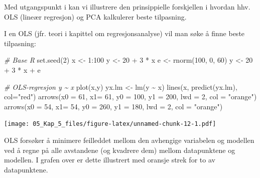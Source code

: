 \documentclass[
]{article}
\newenvironment{Shaded}{\begin{snugshade}}{\end{snugshade}}
\newcommand{\AttributeTok}[1]{\textcolor[rgb]{0.77,0.63,0.00}{#1}}
\newcommand{\CommentTok}[1]{\textcolor[rgb]{0.56,0.35,0.01}{\textit{#1}}}
\newcommand{\DecValTok}[1]{\textcolor[rgb]{0.00,0.00,0.81}{#1}}
\newcommand{\FunctionTok}[1]{\textcolor[rgb]{0.00,0.00,0.00}{#1}}
\newcommand{\NormalTok}[1]{#1}
\newcommand{\OtherTok}[1]{\textcolor[rgb]{0.56,0.35,0.01}{#1}}
\newcommand{\SpecialCharTok}[1]{\textcolor[rgb]{0.00,0.00,0.00}{#1}}
\newcommand{\StringTok}[1]{\textcolor[rgb]{0.31,0.60,0.02}{#1}}
\begin{document}
Med utgangspunkt i \citet{longPrincipalComponentAnalysis2010} kan vi illustrere den prinsippielle forskjellen i hvordan hhv. OLS (lineær regresjon) og PCA kalkulerer beste tilpasning.

I en OLS (jfr. teori i kapittel om regresjonsanalyse) vil man søke å finne beste tilpasning:

\begin{Shaded}
\begin{Highlighting}[]
\CommentTok{\# Base R}
\FunctionTok{set.seed}\NormalTok{(}\DecValTok{2}\NormalTok{)}
\NormalTok{x }\OtherTok{\textless{}{-}} \DecValTok{1}\SpecialCharTok{:}\DecValTok{100}
\NormalTok{y }\OtherTok{\textless{}{-}} \DecValTok{20} \SpecialCharTok{+} \DecValTok{3} \SpecialCharTok{*}\NormalTok{ x}
\NormalTok{e }\OtherTok{\textless{}{-}} \FunctionTok{rnorm}\NormalTok{(}\DecValTok{100}\NormalTok{, }\DecValTok{0}\NormalTok{, }\DecValTok{60}\NormalTok{)}
\NormalTok{y }\OtherTok{\textless{}{-}} \DecValTok{20} \SpecialCharTok{+} \DecValTok{3} \SpecialCharTok{*}\NormalTok{ x }\SpecialCharTok{+}\NormalTok{ e}

\CommentTok{\# OLS{-}regresjon y \textasciitilde{} x}
\FunctionTok{plot}\NormalTok{(x,y)}
\NormalTok{yx.lm }\OtherTok{\textless{}{-}} \FunctionTok{lm}\NormalTok{(y }\SpecialCharTok{\textasciitilde{}}\NormalTok{ x)}
\FunctionTok{lines}\NormalTok{(x, }\FunctionTok{predict}\NormalTok{(yx.lm), }\AttributeTok{col=}\StringTok{"red"}\NormalTok{)}
\FunctionTok{arrows}\NormalTok{(}\AttributeTok{x0 =} \DecValTok{61}\NormalTok{, }\AttributeTok{x1=} \DecValTok{61}\NormalTok{, }\AttributeTok{y0 =} \DecValTok{100}\NormalTok{, }\AttributeTok{y1 =} \DecValTok{200}\NormalTok{, }\AttributeTok{lwd =} \DecValTok{2}\NormalTok{, }\AttributeTok{col =} \StringTok{"orange"}\NormalTok{)}
\FunctionTok{arrows}\NormalTok{(}\AttributeTok{x0 =} \DecValTok{54}\NormalTok{, }\AttributeTok{x1=} \DecValTok{54}\NormalTok{, }\AttributeTok{y0 =} \DecValTok{260}\NormalTok{, }\AttributeTok{y1 =} \DecValTok{180}\NormalTok{, }\AttributeTok{lwd =} \DecValTok{2}\NormalTok{, }\AttributeTok{col =} \StringTok{"orange"}\NormalTok{)}
\end{Highlighting}
\end{Shaded}

\texttt{[image: 05\_Kap\_5\_files/figure-latex/unnamed-chunk-12-1.pdf]}

OLS forsøker å minimere feilleddet mellom den avhengige variabelen og modellen ved å regne på alle avstandene (og kvadrere dem) mellom datapunktene og modellen. I grafen over er dette illustrert med oransje strek for to av datapunktene.
\end{document}
